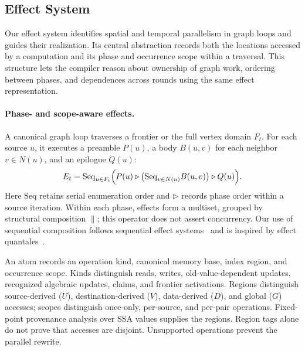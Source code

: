 
\subsection{Effect System}
\label{sec:effect-system}
Our effect system identifies spatial and temporal parallelism in graph
loops and guides their realization. Its central abstraction records both
the locations accessed by a computation and its phase and occurrence
scope within a traversal. This structure lets the compiler reason about
ownership of graph work, ordering between phases, and dependences across
rounds using the same effect representation.

\paragraph{Phase- and scope-aware effects.}
A canonical graph loop traverses a frontier or the full vertex domain
$F_t$. For each source $u$, it executes a preamble $P(u)$, a body $B(u,v)$
for each neighbor $v\in N(u)$, and an epilogue $Q(u)$:
\begin{equation}
E_t=\mathrm{Seq}_{u\in F_t}\Bigl(
P(u)\triangleright
\bigl(\mathrm{Seq}_{v\in N(u)}B(u,v)\bigr)
\triangleright Q(u)\Bigr).
\label{eq:effect-expr}
\end{equation}
Here $\mathrm{Seq}$ retains serial enumeration order and
$\triangleright$ records phase order within a source iteration.
Within each phase, effects form a multiset, grouped by structural
composition $\parallel$; this operator does not assert concurrency.
Our use of sequential composition follows sequential effect
systems~\cite{10.1145/2429069.2429074} and is inspired by effect
quantales~\cite{gordon2017genericapproachflowsensitivepolymorphic,10.1145/3450272}.

An atom records an operation kind, canonical memory base, index region,
and occurrence scope. Kinds distinguish reads, writes, old-value-dependent
updates, recognized algebraic updates, claims, and frontier activations.
Regions distinguish source-derived ($U$), destination-derived ($V$),
data-derived ($D$), and global ($G$) accesses; scopes distinguish
once-only, per-source, and per-pair operations. Fixed-point provenance
analysis over SSA values supplies the regions. Region tags alone do not
prove that accesses are disjoint. Unsupported operations prevent the
parallel rewrite.

